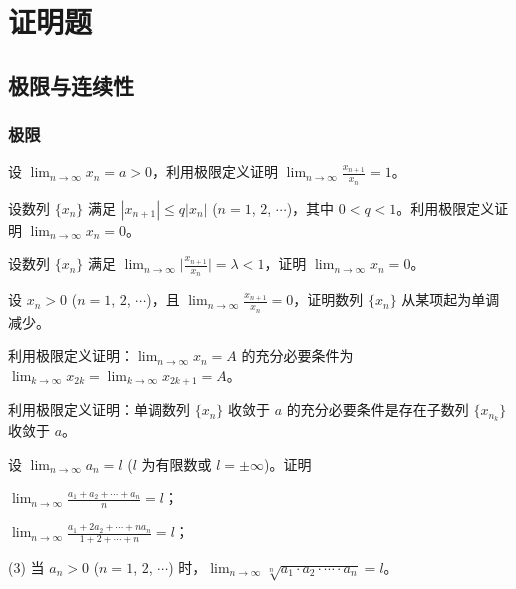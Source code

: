 \part{证明题}
	\chapter{极限与连续性}
	\section{极限}\label{sec:1.1.1}
	\begin{ti}
		设 $\lim_{n \to \infty} x_n = a > 0$，利用极限定义证明 $\lim_{n \to \infty} \frac{x_{n+1}}{x_n} = 1$。
	\end{ti}

	\begin{ti}
		设数列 $\{x_n\}$ 满足 $|x_{n+1}| \leq q|x_n|$ ($n = 1$, $2$, $\cdots$)，其中 $0<q<1$。利用极限定义证明 $\lim_{n \to \infty} x_n = 0$。
		\begin{bianshi}
			设数列 $\{x_n\}$ 满足 $\lim_{n \to \infty} \bigl| \frac{x_{n+1}}{x_n} \bigr| = \lambda < 1$，证明 $\lim_{n \to \infty} x_n = 0$。
		\end{bianshi}
		\begin{bianshi}
			设 $x_n > 0$ ($n=1$, $2$, $\cdots$)，且 $\lim_{n \to \infty} \frac{x_{n+1}}{x_n} = 0$，证明数列 $\{x_n\}$ 从某项起为单调减少。
		\end{bianshi}
	\end{ti}

	\begin{ti}
		利用极限定义证明：$\lim_{n \to \infty} x_n = A$ 的充分必要条件为 $\lim_{k \to \infty} x_{2k} = \lim_{k \to \infty} x_{2k+1} = A$。
	\end{ti}

	\begin{ti}
		利用极限定义证明：单调数列 $\{x_n\}$ 收敛于 $a$ 的充分必要条件是存在子数列 $\{x_{n_k}\}$ 收敛于 $a$。
	\end{ti}

	\begin{ti}
		设 $\lim_{n \to \infty} a_n = l$ ($l$ 为有限数或 $l = \pm \infty$)。证明
		\begin{xiaoti}
			\item $\lim_{n \to \infty} \frac{a_1 + a_2 + \cdots + a_n}{n} = l$；
			\item $\lim_{n \to \infty} \frac{a_1 + 2a_2 + \cdots + na_n}{1+2+\cdots+n} = l$；
			\item[(3)] \xing{} 当 $a_n > 0$ ($n=1$, $2$, $\cdots$) 时，$\lim_{n \to \infty} \sqrt[n]{a_1 \cdot a_2 \cdot \cdots \cdot a_n} = l$。
		\end{xiaoti}
	\end{ti}

